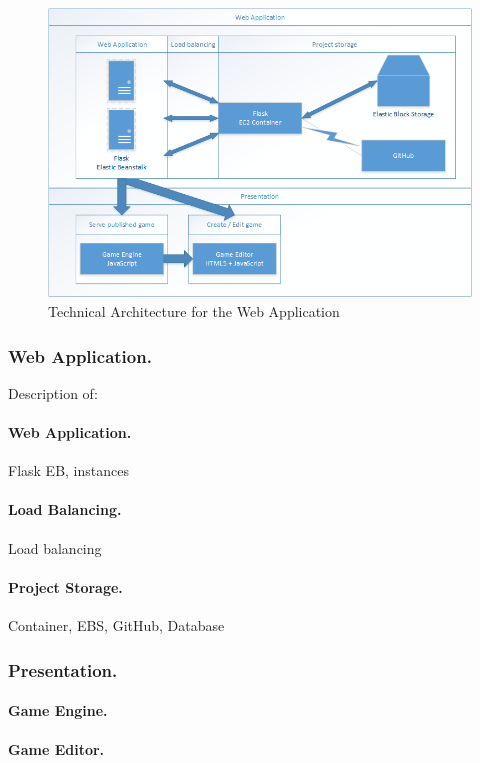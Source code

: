 \documentclass[a4paper, 12pt]{article}
\begin{document}
\begin{figure}[h]
	\centering
	\includegraphics[scale=0.72]{architecture}
	\caption{Technical Architecture for the Web Application}
	\label{fig:architecture}
\end{figure}

\subsubsection{Web Application.}

Description of:

\paragraph{Web Application.}
Flask EB, instances

\paragraph{Load Balancing.}
Load balancing

\paragraph{Project Storage.}
Container, EBS, GitHub, Database

\subsubsection{Presentation.}
\paragraph{Game Engine.}
\paragraph{Game Editor.}
\end{document}

